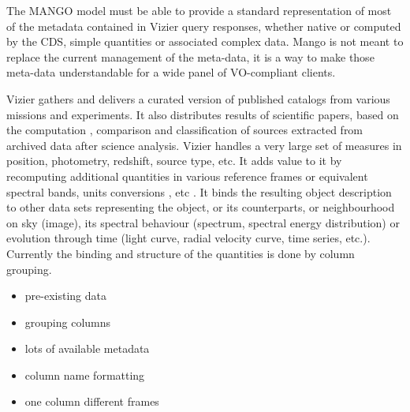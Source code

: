 The MANGO model must be able to provide a standard representation of most of the metadata contained in Vizier query responses, whether native or computed  by the CDS, simple quantities or associated complex data.
Mango is not meant to replace the current management of the meta-data, it is a way to make those meta-data understandable for a wide panel of VO-compliant clients.

%
%
%
%


Vizier gathers and delivers a curated version of published catalogs from various missions and experiments.
It also distributes results of scientific papers, based on the computation , comparison and classification of sources extracted from archived data after science analysis.
Vizier handles a very large set of measures in position, photometry, redshift, source type, etc.
It adds value to it by recomputing additional quantities in various reference frames or equivalent spectral bands, units conversions , etc .
It binds the resulting object description to other data sets representing the object, or its counterparts, or neighbourhood on sky (image), its spectral behaviour (spectrum, spectral energy distribution) or evolution through time (light curve, radial velocity curve, time series, etc.).
Currently the binding and structure of the quantities is done by column grouping.
\begin{itemize}
    \item pre-existing data
    \item grouping columns
    \item lots of available metadata
    \item column name formatting
    \item one column different frames
\end{itemize}
